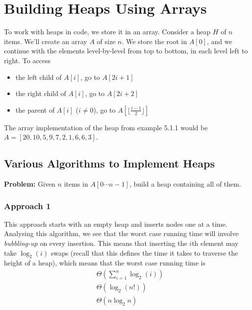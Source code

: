 \documentclass{report}
\begin{document}
\section{Building Heaps Using Arrays}
To work with heaps in code, we store it in an array. Consider a heap $H$ of $n$ items. We'll create an array $A$ of size $n$. We store the root in $A[0]$, and we continue with the elements level-by-level from top to bottom, in each level left to right. To access
\begin{itemize}
\item the left child of $A[i]$, go to $A[2i + 1]$
\item the right child of $A[i]$, go to $A[2i + 2]$
\item the parent of $A[i]$ ($i \neq 0$), go to $A[\lfloor\frac{i-1}{2}\rfloor]$
\end{itemize}
The array implementation of the heap from example 5.1.1 would be $A = [20, 10, 5, 9, 7, 2, 1, 6, 6, 3]$.
\subsection{Various Algorithms to Implement Heaps}
\textbf{Problem:} Given $n$ items in $A[0 \cdots n-1]$, build a heap containing all of them.
\subsubsection{Approach 1}
This approach starts with an empty heap and inserts nodes one at a time. Analysing this algorithm, we see that the worst case running time will involve \textit{bubbling-up} on every insertion. This means that inserting the $i$th element may take $\log_2 (i)$ swaps (recall that this defines the time it takes to traverse the height of a heap), which means that the worst case running time is
\begin{align*}
&\Theta\left(\sum_{i=1}^n \log_2 (i)\right) \\
&\Theta(\log_2 (n!)) \\
&\Theta(n \log_2 n)
\end{align*}
\end{document}
